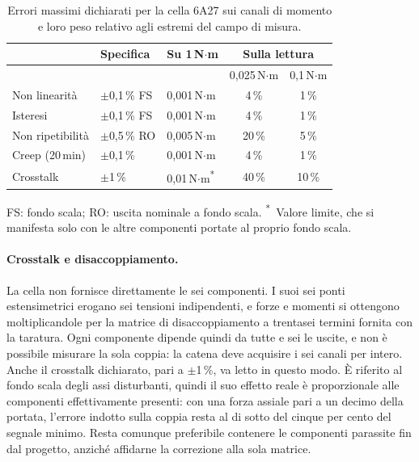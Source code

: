 \begin{table}[!tb]
    \centering
    \caption{Errori massimi dichiarati per la cella 6A27 sui canali di momento e
    loro peso relativo agli estremi del campo di misura.}
    \label{tab:errori}
    \footnotesize
    \setlength{\tabcolsep}{4pt}
    \begin{tabularx}{\linewidth}{@{}>{\raggedright\arraybackslash}X l l c c@{}}
        \toprule
        \multirow{2}{*}{Contributo} & \multirow{2}{*}{Specifica} &
        \multirow{2}{*}{Su 1\,N$\cdot$m} & \multicolumn{2}{c}{Sulla lettura} \\
        \cmidrule(l){4-5}
         & & & 0,025\,N$\cdot$m & 0,1\,N$\cdot$m \\
        \midrule
        Non linearità     & $\pm$0,1\,\% FS & 0,001\,N$\cdot$m & 4\,\%  & 1\,\% \\
        Isteresi          & $\pm$0,1\,\% FS & 0,001\,N$\cdot$m & 4\,\%  & 1\,\% \\
        Non ripetibilità  & $\pm$0,5\,\% RO & 0,005\,N$\cdot$m & 20\,\% & 5\,\% \\
        Creep (20\,min)   & $\pm$0,1\,\%    & 0,001\,N$\cdot$m & 4\,\%  & 1\,\% \\
        Crosstalk         & $\pm$1\,\%      & 0,01\,N$\cdot$m\textsuperscript{*} & 40\,\% & 10\,\% \\
        \bottomrule
    \end{tabularx}

    \vspace{2pt}
    \footnotesize\raggedright
    FS: fondo scala; RO: uscita nominale a fondo scala.
    \textsuperscript{*}~Valore limite, che si manifesta solo con le altre
    componenti portate al proprio fondo scala.
\end{table}

\paragraph{Crosstalk e disaccoppiamento.}
La cella non fornisce direttamente le sei componenti. I suoi sei ponti
estensimetrici erogano sei tensioni indipendenti, e forze e momenti si ottengono
moltiplicandole per la matrice di disaccoppiamento a trentasei termini fornita
con la taratura. Ogni componente dipende quindi da tutte e sei le uscite, e non è
possibile misurare la sola coppia: la catena deve acquisire i sei canali per
intero. Anche il crosstalk dichiarato, pari a $\pm$1\,\%, va letto in questo
modo. È riferito al fondo scala degli assi disturbanti, quindi il suo effetto
reale è proporzionale alle componenti effettivamente presenti: con una forza
assiale pari a un decimo della portata, l'errore indotto sulla coppia resta al di
sotto del cinque per cento del segnale minimo. Resta comunque preferibile
contenere le componenti parassite fin dal progetto, anziché affidarne la
correzione alla sola matrice.

